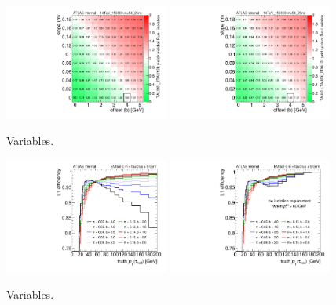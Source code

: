 \begin{figure}[tp]
  \centering
  \includegraphics[width=0.48\textwidth]{figures/trigger/iso_background_noTAU60}
  \includegraphics[width=0.48\textwidth]{figures/trigger/iso_background_yesTAU60}
  \caption{Variables.}
  \label{fig:prospects-trigger-isolation-rate}
\end{figure}

\begin{figure}[tp]
  \centering
  \includegraphics[width=0.48\textwidth]{figures/trigger/iso_turnonL1_noTAU60}
  \includegraphics[width=0.48\textwidth]{figures/trigger/iso_turnonL1_yesTAU60}
  \caption{Variables.}
  \label{fig:prospects-trigger-isolation-turnon}
\end{figure}

